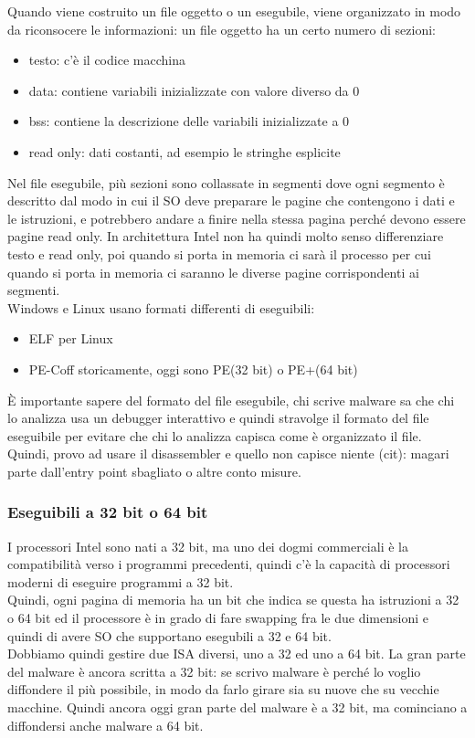 \documentclass{article}
\begin{document}
Quando viene costruito un file oggetto o un esegubile, viene organizzato in modo da riconsocere le informazioni: un file oggetto ha un certo numero di sezioni:
\begin{itemize}
\item testo: c'è il codice macchina
\item data: contiene variabili inizializzate con valore diverso da 0
\item bss: contiene la descrizione delle variabili inizializzate a 0
\item read only: dati costanti, ad esempio le stringhe esplicite
\end{itemize}
Nel file esegubile, più sezioni sono collassate in segmenti dove ogni segmento è descritto dal modo in cui il SO deve preparare le pagine che contengono i dati e le istruzioni, e potrebbero andare a finire nella stessa pagina perché devono essere pagine read only. In architettura Intel non ha quindi molto senso differenziare testo e read only, poi quando si porta in memoria ci sarà il processo per cui quando si porta in memoria ci saranno le diverse pagine corrispondenti ai segmenti.\\ Windows e Linux usano formati differenti di eseguibili:
\begin{itemize}
\item ELF per Linux
\item PE-Coff storicamente, oggi sono PE(32 bit) o PE+(64 bit)
\end{itemize}
È importante sapere del formato del file esegubile, chi scrive malware sa che chi lo analizza usa un debugger interattivo e quindi stravolge il formato del file eseguibile per evitare che chi lo analizza capisca come è organizzato il file. Quindi, provo ad usare il disassembler e quello non capisce niente (cit): magari parte dall'entry point sbagliato o altre conto misure.
\subsubsection{Eseguibili a 32 bit o 64 bit}
I processori Intel sono nati a 32 bit, ma uno dei dogmi commerciali è la compatibilità verso i programmi precedenti, quindi c'è la capacità di processori moderni di eseguire programmi a 32 bit.\\ Quindi, ogni pagina di memoria ha un bit che indica se questa ha istruzioni a 32 o 64 bit ed il processore è in grado di fare swapping fra le due dimensioni e quindi di avere SO che supportano esegubili a 32 e 64 bit. \\ Dobbiamo quindi gestire due ISA diversi, uno a 32 ed uno a 64 bit. La gran parte del malware è ancora scritta a 32 bit: se scrivo malware è perché lo voglio diffondere il più possibile, in modo da farlo girare sia su nuove che su vecchie macchine. Quindi ancora oggi gran parte del malware è a 32 bit, ma cominciano a diffondersi anche malware a 64 bit.
\end{document}
